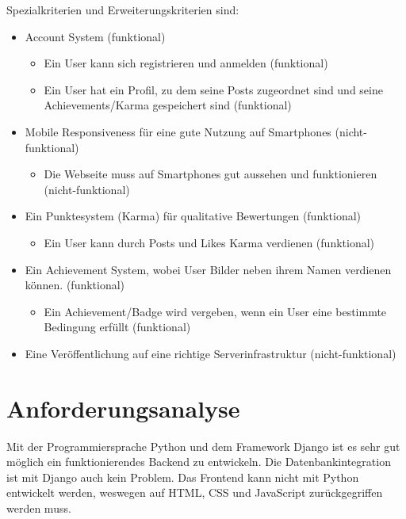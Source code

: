 Spezialkriterien und Erweiterungskriterien sind:
\begin{itemize}
    \item Account System (funktional)
    \begin{itemize}
        \item Ein User kann sich registrieren und anmelden (funktional)
        \item Ein User hat ein Profil, zu dem seine Posts zugeordnet sind und seine Achievements/Karma gespeichert sind (funktional)
    \end{itemize} 
    \item Mobile Responsiveness für eine gute Nutzung auf Smartphones (nicht-funktional)
    \begin{itemize}
        \item Die Webseite muss auf Smartphones gut aussehen und funktionieren (nicht-funktional)
    \end{itemize}
    \item Ein Punktesystem (Karma) für qualitative Bewertungen (funktional)
    \begin{itemize}
        \item Ein User kann durch Posts und Likes Karma verdienen (funktional)
    \end{itemize}
    \item Ein Achievement System, wobei User Bilder neben ihrem Namen verdienen können. (funktional)
    \begin{itemize}
        \item Ein Achievement/Badge wird vergeben, wenn ein User eine bestimmte Bedingung erfüllt (funktional)
    \end{itemize}
    \item Eine Veröffentlichung auf eine richtige Serverinfrastruktur (nicht-funktional)
\end{itemize}

\section{Anforderungsanalyse} \label{sec:anforderungsanalyse}

Mit der Programmiersprache Python und dem Framework Django ist es sehr gut
möglich ein funktionierendes Backend zu entwickeln. Die Datenbankintegration ist
mit Django auch kein Problem. Das Frontend kann nicht mit Python entwickelt
werden, weswegen auf HTML, CSS und JavaScript zurückgegriffen werden muss.
